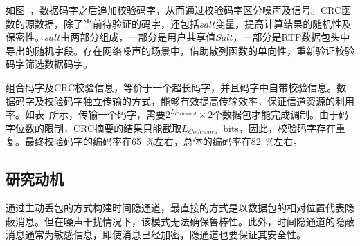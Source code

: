 如图\ ，数据码字之后追加校验码字，从而通过校验码字区分噪声及信号。CRC函数的源数据，除了当前待验证的码字，还包括$salt$变量，提高计算结果的随机性及保密性。$salt$由两部分组成，一部分是用户共享值$Salt$，一部分是RTP数据包头中导出的随机字段。存在网络噪声的场景中，借助散列函数的单向性，重新验证校验码字筛选数据码字。


组合码字及CRC校验信息，等价于一个超长码字，并且码字中自带校验信息。数据码字及校验码字独立传输的方式，能够有效提高传输效率，保证信道资源的利用率。如表\ 所示，传输一个码字，需要$2^{L_{Codeword}}\times 2$个数据包才能完成调制。由于码字位数的限制，CRC摘要的结果只能截取{$L_{Codeword}$\ bits}，因此，校验码字存在重复。最终校验码字的编码率在65\ \%左右，总体的编码率在82\ \%左右。

\subsection{研究动机}
\label{chap:zigzag:motivation:conclude}
通过主动丢包的方式构建时间隐通道，最直接的方式是以数据包的相对位置代表隐蔽消息。但在噪声干扰情况下，该模式无法确保鲁棒性。此外，时间隐通道的隐蔽消息通常为敏感信息，即使消息已经加密，隐通道也要保证其安全性。


